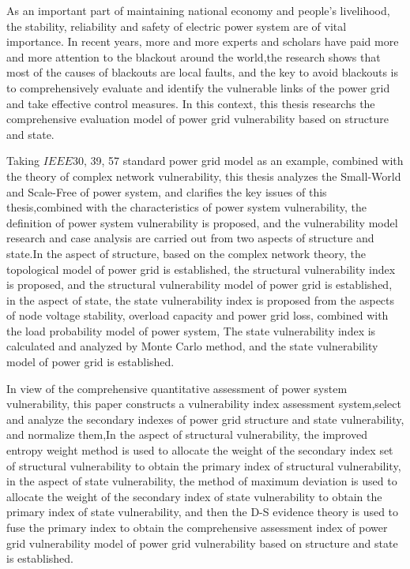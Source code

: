 \begin{eabstract}
  As an important part of maintaining national economy and people's livelihood, the stability, reliability and safety of electric power system are of vital importance.
  In recent years, more and more experts and scholars have paid more and more attention to the blackout around the world,the research shows that most of the causes of 
  blackouts are local faults, and the key to avoid blackouts is to comprehensively evaluate and identify the vulnerable links of the power grid and take effective control 
  measures. In this context, this thesis researchs the comprehensive evaluation model of power grid vulnerability based on structure and state.

  Taking $IEEE30$, 39, 57 standard power grid model as an example, combined with the theory of complex network vulnerability, this thesis analyzes the Small-World and Scale-Free 
  of power system, and clarifies the key issues of this thesis,combined with the characteristics of power system vulnerability, the definition of power system vulnerability is 
  proposed, and the vulnerability model research and case analysis are carried out from two aspects of structure and state.In the aspect of structure, based on the complex 
  network theory, the topological model of power grid is established, the structural vulnerability index is proposed, and the structural vulnerability model of power grid is 
  established, in the aspect of state, the state vulnerability index is proposed from the aspects of node voltage stability, overload capacity and power grid loss, combined 
  with the load probability model of power system, The state vulnerability index is calculated and analyzed by Monte Carlo method, and the state vulnerability model of power 
  grid is established.

  In view of the comprehensive quantitative assessment of power system vulnerability, this paper constructs a vulnerability index assessment system,select and analyze the 
  secondary indexes of power grid structure and state vulnerability, and normalize them,In the aspect of structural vulnerability, the improved entropy weight method is used 
  to allocate the weight of the secondary index set of structural vulnerability to obtain the primary index of structural vulnerability, in the aspect of state vulnerability, 
  the method of maximum deviation is used to allocate the weight of the secondary index of state vulnerability to obtain the primary index of state vulnerability, and then the 
  D-S evidence theory is used to fuse the primary index to obtain the comprehensive assessment index of power grid vulnerability model of power grid vulnerability based on 
  structure and state is established.


\end{eabstract}
